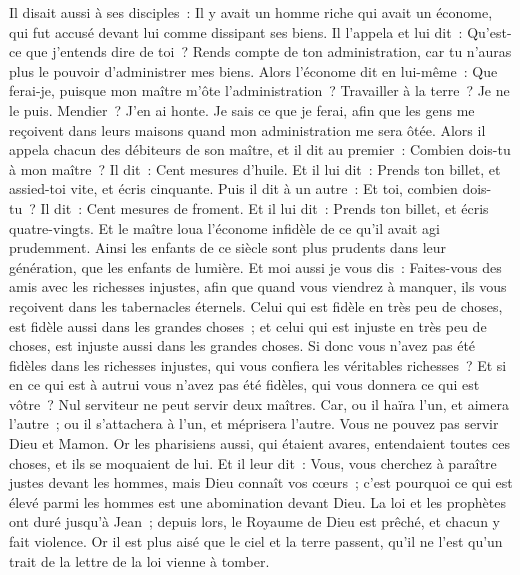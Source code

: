\begin{multicols}{2}
\VerseOne{}Il disait aussi à ses disciples~: Il y avait un homme riche qui avait un économe, qui fut accusé devant lui comme dissipant ses biens.
Il l'appela et lui dit~: Qu'est-ce que j'entends dire de toi~? Rends compte de ton administration, car tu n'auras plus le pouvoir d'administrer mes biens.
Alors l'économe dit en lui-même~: Que ferai-je, puisque mon maître m'ôte l'administration~? Travailler à la terre~? Je ne le puis. Mendier~? J'en ai honte.
Je sais ce que je ferai, afin que les gens me reçoivent dans leurs maisons quand mon administration me sera ôtée.
Alors il appela chacun des débiteurs de son maître, et il dit au premier~: Combien dois-tu à mon maître~?
Il dit~: Cent mesures d'huile. Et il lui dit~: Prends ton billet, et assied-toi vite, et écris cinquante.
Puis il dit à un autre~: Et toi, combien dois-tu~? Il dit~: Cent mesures de froment. Et il lui dit~: Prends ton billet, et écris quatre-vingts.
Et le maître loua l'économe infidèle de ce qu'il avait agi prudemment. Ainsi les enfants de ce siècle sont plus prudents dans leur génération, que les enfants de lumière.
Et moi aussi je vous dis~: Faites-vous des amis avec les richesses injustes, afin que quand vous viendrez à manquer, ils vous reçoivent dans les tabernacles éternels.
Celui qui est fidèle en très peu de choses, est fidèle aussi dans les grandes choses~; et celui qui est injuste en très peu de choses, est injuste aussi dans les grandes choses.
Si donc vous n'avez pas été fidèles dans les richesses injustes, qui vous confiera les véritables richesses~?
Et si en ce qui est à autrui vous n'avez pas été fidèles, qui vous donnera ce qui est vôtre~?
Nul serviteur ne peut servir deux maîtres. Car, ou il haïra l'un, et aimera l'autre~; ou il s'attachera à l'un, et méprisera l'autre. Vous ne pouvez pas servir Dieu et Mamon.
Or les pharisiens aussi, qui étaient avares, entendaient toutes ces choses, et ils se moquaient de lui.
Et il leur dit~: Vous, vous cherchez à paraître justes devant les hommes, mais Dieu connaît vos cœurs~; c'est pourquoi ce qui est élevé parmi les hommes est une abomination devant Dieu.
La loi et les prophètes ont duré jusqu'à Jean~; depuis lors, le Royaume de Dieu est prêché, et chacun y fait violence.
Or il est plus aisé que le ciel et la terre passent, qu'il ne l'est qu'un trait de la lettre de la loi vienne à tomber.

\end{multicols}
